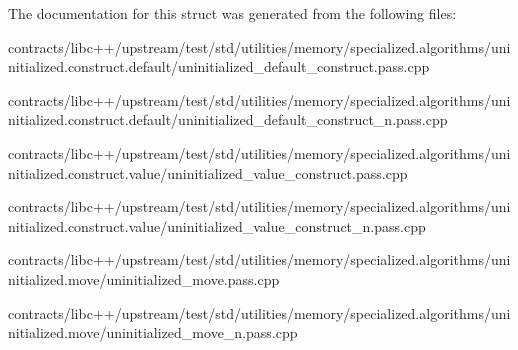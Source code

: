 The documentation for this struct was generated from the following files\+:\begin{DoxyCompactItemize}
\item 
contracts/libc++/upstream/test/std/utilities/memory/specialized.\+algorithms/uninitialized.\+construct.\+default/uninitialized\+\_\+default\+\_\+construct.\+pass.\+cpp\item 
contracts/libc++/upstream/test/std/utilities/memory/specialized.\+algorithms/uninitialized.\+construct.\+default/uninitialized\+\_\+default\+\_\+construct\+\_\+n.\+pass.\+cpp\item 
contracts/libc++/upstream/test/std/utilities/memory/specialized.\+algorithms/uninitialized.\+construct.\+value/uninitialized\+\_\+value\+\_\+construct.\+pass.\+cpp\item 
contracts/libc++/upstream/test/std/utilities/memory/specialized.\+algorithms/uninitialized.\+construct.\+value/uninitialized\+\_\+value\+\_\+construct\+\_\+n.\+pass.\+cpp\item 
contracts/libc++/upstream/test/std/utilities/memory/specialized.\+algorithms/uninitialized.\+move/uninitialized\+\_\+move.\+pass.\+cpp\item 
contracts/libc++/upstream/test/std/utilities/memory/specialized.\+algorithms/uninitialized.\+move/uninitialized\+\_\+move\+\_\+n.\+pass.\+cpp\end{DoxyCompactItemize}
